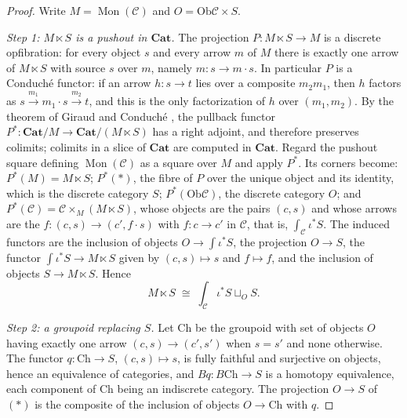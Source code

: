 \documentclass[11pt]{amsart}
\theoremstyle{definition}
\theoremstyle{remark}
\numberwithin{figure}{section}%
\DeclareMathOperator{\Mon}{Mon}
\newcommand{\C}{\mathcal{C}}
\newcommand{\Ob}{\mathrm{Ob}}
\newcommand{\Cat}{\mathbf{Cat}}
\begin{document}
\begin{proof}
Write $M=\Mon(\C)$ and $O=\Ob\C\times S$.

\emph{Step 1: $M\ltimes S$ is a pushout in $\Cat$.} The projection $P\colon M\ltimes S\to M$ is a discrete opfibration: for every object $s$ and every arrow $m$ of $M$ there is exactly one arrow of $M\ltimes S$ with source $s$ over $m$, namely $m\colon s\to m\cdot s$. In particular $P$ is a Conduché functor: if an arrow $h\colon s\to t$ lies over a composite $m_2m_1$, then $h$ factors as $s\xrightarrow{m_1}m_1\cdot s\xrightarrow{m_2}t$, and this is the only factorization of $h$ over $(m_1,m_2)$. By the theorem of Giraud and Conduché \cite{Giraud,Conduche}, the pullback functor $P^*\colon\Cat/M\to\Cat/(M\ltimes S)$ has a right adjoint, and therefore preserves colimits; colimits in a slice of $\Cat$ are computed in $\Cat$. Regard the pushout square defining $\Mon(\C)$ as a square over $M$ and apply $P^*$. Its corners become: $P^*(M)=M\ltimes S$; $P^*(*)$, the fibre of $P$ over the unique object and its identity, which is the discrete category $S$; $P^*(\Ob\C)$, the discrete category $O$; and $P^*(\C)=\C\times_M(M\ltimes S)$, whose objects are the pairs $(c,s)$ and whose arrows are the $f\colon(c,s)\to(c',f\cdot s)$ with $f\colon c\to c'$ in $\C$, that is, $\int_\C\iota^*S$. The induced functors are the inclusion of objects $O\to\int\iota^*S$, the projection $O\to S$, the functor $\int\iota^*S\to M\ltimes S$ given by $(c,s)\mapsto s$ and $f\mapsto f$, and the inclusion of objects $S\to M\ltimes S$. Hence
\[
M\ltimes S\;\cong\;\textstyle\int_\C\iota^*S\sqcup_{O}S.\tag{$*$}
\]

\emph{Step 2: a groupoid replacing $S$.} Let $\mathrm{Ch}$ be the groupoid with set of objects $O$ having exactly one arrow $(c,s)\to(c',s')$ when $s=s'$ and none otherwise. The functor $q\colon\mathrm{Ch}\to S$, $(c,s)\mapsto s$, is fully faithful and surjective on objects, hence an equivalence of categories, and $Bq\colon B\mathrm{Ch}\to S$ is a homotopy equivalence, each component of $\mathrm{Ch}$ being an indiscrete category. The projection $O\to S$ of $(*)$ is the composite of the inclusion of objects $O\to\mathrm{Ch}$ with $q$.


\end{proof}
\end{document}

